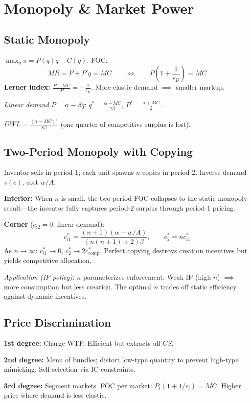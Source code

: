 \section{Monopoly \& Market Power}

\subsection{Static Monopoly}
$\max_q \pi = P(q)q - C(q)$. FOC:
$$MR = P + P'q = MC \qquad \iff \qquad P\!\left(1 + \frac{1}{\epsilon_D}\right) = MC$$
\textbf{Lerner index:} $\frac{P - MC}{P} = -\frac{1}{\epsilon_D}$. More elastic demand $\implies$ smaller markup.

\textit{Linear demand} $P = \alpha - \beta q$: $q^* = \frac{\alpha - MC}{2\beta}$, $P^* = \frac{\alpha + MC}{2}$.

$DWL = \frac{(\alpha - MC)^2}{8\beta}$ \quad (one quarter of competitive surplus is lost).

\subsection{Two-Period Monopoly with Copying}
Inventor sells in period 1; each unit spawns $n$ copies in period 2. Inverse demand $v(c)$, cost $w/A$.

\textbf{Interior:} When $n$ is small, the two-period FOC collapses to the static monopoly result---the inventor fully captures period-2 surplus through period-1 pricing.

\textbf{Corner} ($c_{i2}=0$, linear demand):
$$c_{i1}^* = \frac{(n+1)(\alpha - w/A)}{(n(n+1)+2)\beta}, \qquad c_2^* = nc_{i1}^*$$
As $n\to\infty$: $c_{i1}^*\to 0$, $c_2^*\to 2c^*_{\text{comp}}$. Perfect copying destroys creation incentives but yields competitive allocation.

\textit{Application (IP policy):} $n$ parameterizes enforcement. Weak IP (high $n$) $\implies$ more consumption but less creation. The optimal $n$ trades off static efficiency against dynamic incentives.

\subsection{Price Discrimination}
\textbf{1st degree:} Charge WTP. Efficient but extracts all $CS$.

\textbf{2nd degree:} Menu of bundles; distort low-type quantity to prevent high-type mimicking. Self-selection via IC constraints.

\textbf{3rd degree:} Segment markets. FOC per market: $P_i(1 + 1/\epsilon_i) = MC$. Higher price where demand is less elastic.

